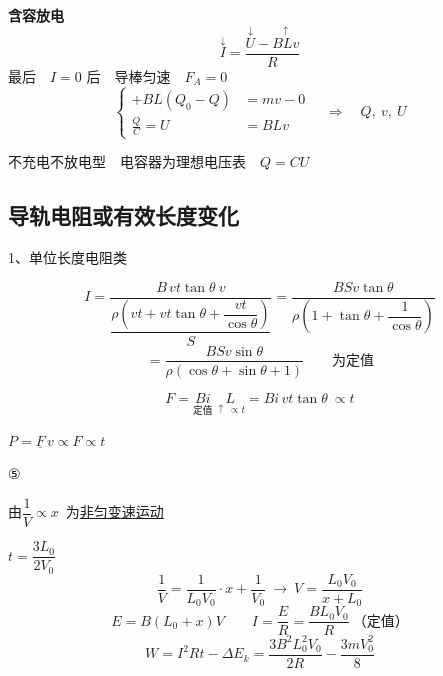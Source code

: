 \textbf{含容放电}
\[
\overset{\downarrow}{I}=\frac{\overset{\downarrow}{U}-\overset{\uparrow}{BLv}}{R}
\]
最后　$I=0$ 后　导棒匀速　$F_A=0$
\[
\left\{\begin{aligned}
+BL(Q_0-Q)&=mv-0\\
\frac{Q}{C}=U&=BLv
\end{aligned}\right.
\quad\Rightarrow\quad Q,\ v,\ U
\]

不充电不放电型　电容器为理想电压表　$Q=CU$

\subsection{导轨电阻或有效长度变化}
1、单位长度电阻类


\[
I=\frac{B\,vt\tan\theta\ v}{\dfrac{\rho\left(vt+vt\tan\theta+\dfrac{vt}{\cos\theta}\right)}{S}}
=\frac{BSv\tan\theta}{\rho\left(1+\tan\theta+\dfrac{1}{\cos\theta}\right)}
\]
\[
=\frac{BSv\sin\theta}{\rho(\cos\theta+\sin\theta+1)}\qquad\text{为定值}
\]


\[
F=\underset{\text{定值}}{Bi}\ \underset{\uparrow\ \propto t}{L}=Bi\,vt\tan\theta\ \propto t
\]


\qquad $P=\underline{F}\,v\propto F\propto t$


⑤


由$\dfrac{1}{V}\propto x$\ 为\uline{非匀变速运动}

\quad $t=\dfrac{3L_0}{2V_0}$
\[ \frac{1}{V}=\frac{1}{L_0V_0}\cdot x+\frac{1}{V_0}\ \to\ V=\frac{L_0V_0}{x+L_0} \]
\[ E=B(L_0+x)V\qquad I=\frac{E}{R}=\frac{BL_0V_0}{R}\ \text{（定值）} \]
\[ W=I^2Rt-\Delta E_k=\frac{3B^2L_0^2V_0}{2R}-\frac{3mV_0^2}{8} \]

